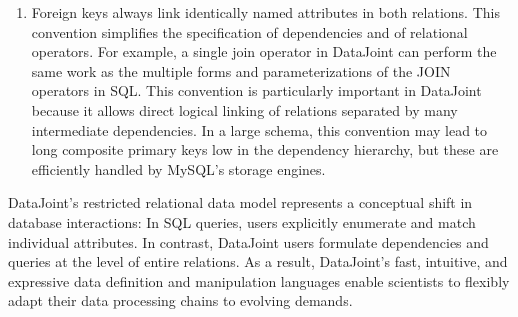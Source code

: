\begin{enumerate}
\item
Foreign keys always link identically named attributes in both relations.
This convention simplifies the specification of dependencies and of relational operators.
For example, a single join operator in DataJoint can perform the same work as the multiple forms and parameterizations of the JOIN operators in SQL.
This convention is particularly important in DataJoint because it allows direct logical linking of relations separated by many intermediate dependencies.
In a large schema, this convention may lead to long composite primary keys low in the dependency hierarchy, but these are efficiently handled by MySQL's storage engines.

\end{enumerate}

DataJoint's restricted relational data model represents a conceptual shift in database interactions: In SQL queries, users explicitly enumerate and match individual attributes.
In contrast, DataJoint users formulate dependencies and queries at the level of entire relations.
As a result, DataJoint's fast, intuitive, and expressive data definition and manipulation languages enable scientists to flexibly adapt their data processing chains to evolving demands.
